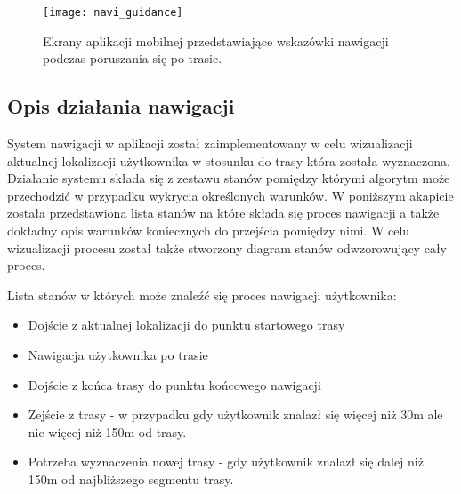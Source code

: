 \begin{figure}[H]
\centering
\texttt{[image: navi\_guidance]}
\caption{Ekrany aplikacji mobilnej przedstawiające wskazówki nawigacji podczas poruszania się po trasie.}
\end{figure}

\subsection{Opis działania nawigacji}

System nawigacji w aplikacji został zaimplementowany w celu wizualizacji aktualnej lokalizacji użytkownika w stosunku do trasy która została wyznaczona. Działanie systemu składa się z zestawu stanów pomiędzy którymi algorytm może przechodzić w przypadku wykrycia określonych warunków. W poniższym akapicie została przedstawiona lista stanów na które składa się proces nawigacji a także dokładny opis warunków koniecznych do przejścia pomiędzy nimi. W celu wizualizacji procesu został także stworzony diagram stanów odwzorowujący cały proces.

Lista stanów w których może znaleźć się proces nawigacji użytkownika:

\begin{itemize}
\item Dojście z aktualnej lokalizacji do punktu startowego trasy
\item Nawigacja użytkownika po trasie
\item Dojście z końca trasy do punktu końcowego nawigacji
\item Zejście z trasy - w przypadku gdy użytkownik znalazł się więcej niż 30m ale nie więcej niż 150m od trasy.
\item Potrzeba wyznaczenia nowej trasy - gdy użytkownik znalazł się dalej niż 150m od najbliższego segmentu trasy.
\end{itemize}


